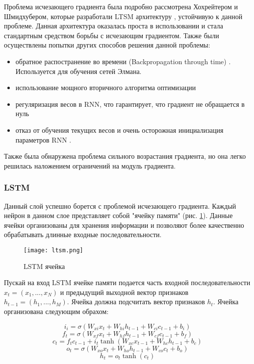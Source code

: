 Проблема исчезающего градиента была подробно рассмотрена Хохрейтером и Шмидхубером, которые разработали LTSM архитектуру \cite{create_lstm}, устойчивую к данной проблеме. Данная архитектура оказалась проста в использовании и стала стандартным средством борьбы с исчезающим градиентом. Также были осуществлены попытки других способов решения данной проблемы:
\begin{itemize}
	\item обратное распостранение во времени (Backpropagation through time) \cite{Backpropagation}. Используется для обучения сетей Элмана.
	\item использование мощного вторичного алгоритма оптимизации \cite{rnnlearning1}
	\item регуляризация весов в RNN, что гарантирует, что градиент не обращается в нуль \cite{rnnlearning2}
	\item отказ от обучения текущих весов и очень
	осторожная инициализация параметров RNN \cite{rnnlearning3}.
\end{itemize}
	
Также была обнаружена проблема сильного возрастания градиента, но она легко решилась наложением ограничений на модуль градиента.

\subsubsection{LSTM}

Данный слой успешно борется с проблемой исчезающего градиента. Каждый нейрон в данном слое представляет собой "ячейку памяти" (рис. \ref{ris:ltsm}). Данные ячейки организованы для хранения информации и позволяют более качественно обрабатывать длинные входные последовательности.

\begin{figure}[h]
\begin{center}
	\texttt{[image: ltsm.png]}
	\caption{LSTM ячейка}
	\label{ris:ltsm}
\end{center}
\end{figure}


Пускай на вход LSTM ячейке памяти подается часть входной последовательности $x_t = (x_1, ..., x_N)$ и предыдущий выходной вектор признаков $h_{t-1} = (h_1, ..., h_M)$. Ячейка должна подсчитать вектор признаков $h_t$. Ячейка организована следующим обрахом:


\begin{equation}
	i_i = \sigma(W_{xi}x_t+W_{hi}h_{t-1}+W_{ci}c_{t-1}+b_i)
\end{equation}
\begin{equation}
	f_t = \sigma(W_{xf}x_t+W_{hf}h_{t-1}+W_{cf}c_{t-1}+b_f)
\end{equation}
\begin{equation}
	c_t = f_tc_{t-1}+i_t\tanh(W_{xc}x_{t-1}+W_{hc}h_{t-1}+b_c)
\end{equation}
\begin{equation}
	o_t = \sigma(W_{xo}x_t+W_{ho}h_{t-1}+W_{co}c_t+b_o)
\end{equation}
\begin{equation}
	h_t = o_t\tanh(c_t)
\end{equation}

